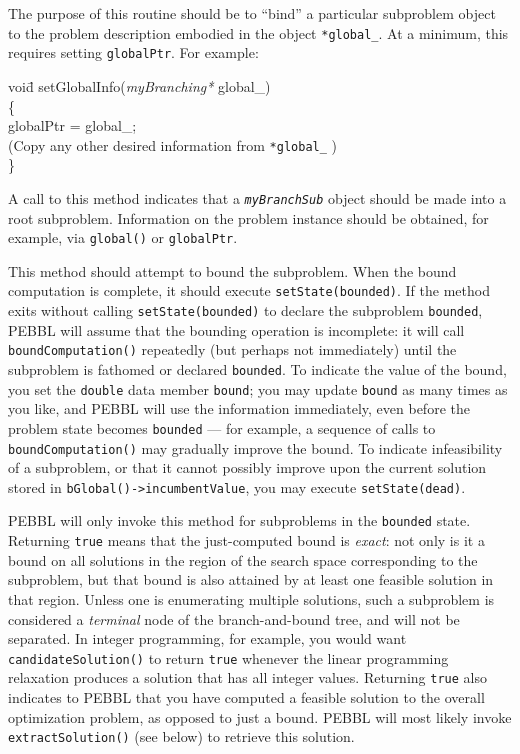 The purpose of this routine should be to ``bind'' a particular
subproblem object to the problem description embodied in the object
\texttt{*global\_}.  At a minimum, this requires setting
\texttt{globalPtr}.  For example:
\begin{codeblock}
voi\=d setGlobalInfo(\emph{myBranching*} global\_) \\
\{ \\
\> globalPtr = global\_; \\
\>\textrm{(Copy any other desired information from
  \texttt{*global\_} )}\\
\}
\end{codeblock}


A call to this method indicates that a \texttt{\emph{myBranchSub}}
object should be made into a root subproblem.  Information on the
problem instance should be obtained, for example, via
\texttt{global()} or \texttt{globalPtr}.

\pagebreak[1]

This method should attempt to bound the subproblem.  When the bound
computation is complete, it should execute \texttt{setState(bounded)}.
If the method exits without calling \texttt{setState(bounded)} to
declare the subproblem \texttt{bounded}, PEBBL will assume that the
bounding operation is incomplete: it will call
\texttt{boundComputation()} repeatedly (but perhaps not immediately) 
until the subproblem is
fathomed or declared \texttt{bounded}.  To indicate the value of the
bound, you set the \texttt{double} data member \texttt{bound};
you may update \texttt{bound} as many times as you like, and PEBBL
will use the information immediately, even before the
problem state becomes \texttt{bounded} --- for example, a sequence of calls
to \texttt{boundComputation()} may gradually improve the bound.
To indicate infeasibility of a subproblem, or that it cannot possibly
improve upon the current solution stored in
\texttt{bGlobal()->incumbentValue}, you may execute
\texttt{setState(dead)}. 


 PEBBL will only invoke this method
for subproblems in the \texttt{bounded} state.  Returning
\texttt{true} means that the just-computed bound is \emph{exact}: not
only is it a bound on all solutions in the region of the search space
corresponding to the subproblem, but that bound is also attained by at
least one feasible solution in that region.  Unless one is enumerating
multiple solutions, such a subproblem is considered a \emph{terminal}
node of the branch-and-bound tree, and will not be separated.  In
integer programming, for example, you would want
\texttt{candidateSolution()} to return \texttt{true} whenever the
linear programming relaxation produces a solution that has all integer
values.  Returning \texttt{true} also indicates to PEBBL that you have
computed a feasible solution to the overall optimization problem, as
opposed to just a bound.  PEBBL will most likely invoke
\texttt{extractSolution()} (see below) to retrieve this solution.



